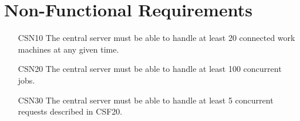 \section{Non-Functional Requirements}
\begin{enumerate}
  \item[CSN10] The central server must be able to handle at least 20 connected work machines at any given time.
  \item[CSN20] The central server must be able to handle at least 100 concurrent jobs.
  \item[CSN30] The central server must be able to handle at least 5 concurrent requests described in CSF20.
\end{enumerate}
